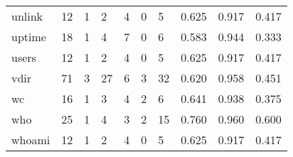 \begin{longtable}{lp{2.0cm}p{2.0cm}p{2.0cm}p{2.0cm}p{2.0cm}p{2.0cm}p{2.0cm}p{2.0cm}p{2.0cm}}
unlink    &                     12 &                                             1 &                                            2 &                                           4 &                                            0 &                                          5 &                                0.625 &                                  0.917 &                                0.417 \\
uptime    &                     18 &                                             1 &                                            4 &                                           7 &                                            0 &                                          6 &                                0.583 &                                  0.944 &                                0.333 \\
users     &                     12 &                                             1 &                                            2 &                                           4 &                                            0 &                                          5 &                                0.625 &                                  0.917 &                                0.417 \\
vdir      &                     71 &                                             3 &                                           27 &                                           6 &                                            3 &                                         32 &                                0.620 &                                  0.958 &                                0.451 \\
wc        &                     16 &                                             1 &                                            3 &                                           4 &                                            2 &                                          6 &                                0.641 &                                  0.938 &                                0.375 \\
who       &                     25 &                                             1 &                                            4 &                                           3 &                                            2 &                                         15 &                                0.760 &                                  0.960 &                                0.600 \\
whoami    &                     12 &                                             1 &                                            2 &                                           4 &                                            0 &                                          5 &                                0.625 &                                  0.917 &                                0.417 \\

\end{longtable}
